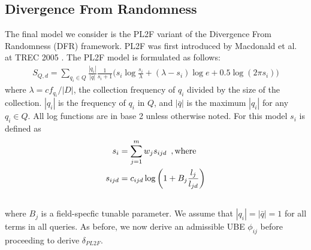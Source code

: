 \documentclass{sig-alternate}
\begin{document}
\subsection{Divergence From Randomness} \label{appendix:pl2f}
The final model we consider is the PL2F variant of the Divergence From Randomness (DFR) framework. PL2F was first introduced by Macdonald et al. at TREC 2005 \cite{macdonald-trec-2005}. The PL2F model is formulated as follows:
\begin{align}
S_{Q,d} = \sum_{q_{i} \in Q} \frac{|q_{i}|}{|{\bar q}|} \frac{1}{s_{i}+1}\Bigg( s_{i} \log\frac{s_{i}}{\lambda} +
(\lambda - s_{i}) \log e  + 0.5 \log (2\pi s_{i}) \Bigg) \label{eq:dfr}
\end{align}
where $\lambda = cf_{q_{i}}/|D|$, the collection frequency of $q_{i}$ divided by the size of the collection. $|q_{i}|$ is the frequency of $q_{i}$ in $Q$, and $|{\bar q}|$ is the maximum $|q_{i}|$ for any $q_{i} \in Q$. All log functions are in base 2 unless otherwise noted. For this model $s_{i}$ is defined as
\begin{align}
s_{i} &= \sum_{j=1}^{m} w_{j} s_{ijd} \hspace{5pt} , \text{where} \\
s_{ijd} &= c_{ijd} \log \left(1 + B_{j}\frac{l_{j}}{l_{jd}} \right) \label{eq:pl2f-scoring} \\ \notag
\end{align}
where $B_{j}$ is a field-specfic tunable parameter. We assume that $|q_{i}| = |{\bar q}| = 1$ for all terms in all queries. As before, we now derive an admissible UBE $\phi_{ij}$ before proceeding to derive $\delta_{PL2F}$. 
\end{document}
